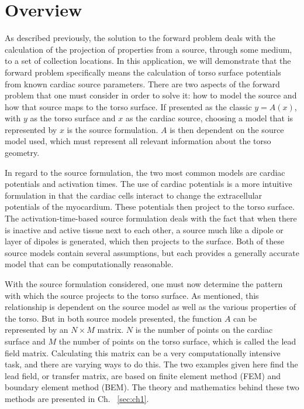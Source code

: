 \documentclass[fleqn,11pt,openany]{book}
\begin{document}
\section{Overview}

As described previously, the solution to the forward problem deals with the calculation of the projection of properties from a source, through some medium, to a set of collection locations. In this application, we will demonstrate that the forward problem specifically means the calculation of torso surface potentials from known cardiac source parameters. There are two aspects of the forward problem that one must consider in order to solve it: how to model the source and how that source maps to the torso surface. If presented as the classic $y=A(x)$,  with $y$ as the torso surface and $x$ as the cardiac source, choosing a model that is represented by $x$ is the source formulation. $A$ is then dependent on the source model used, which must represent all relevant information about the torso geometry.

In regard to the source formulation, the two most common models are cardiac potentials and activation times. The use of cardiac potentials is a more intuitive formulation in that the cardiac cells interact to change the extracellular potentials of the myocardium. These potentials then project to the torso surface. The activation-time-based source formulation deals with the fact that when there is inactive and active tissue next to each other, a source much like a dipole or layer of dipoles is generated, which then projects to the surface. Both of these source models contain several assumptions, but each provides a generally accurate model that can be computationally reasonable.

With the source formulation considered, one must now determine the pattern with which the source projects to the torso surface. As mentioned, this relationship is dependent on the source model as well as the various properties of the torso. But in both source models presented, the function $A$ can be represented by an $N \times M$ matrix. $N$ is the number of points on the cardiac surface and $M$ the number of points on the torso surface, which is called the lead field matrix. Calculating this matrix can be a very computationally intensive task, and there are varying ways to do this. The two examples given here find the lead field, or transfer matrix, are based on finite element method (FEM) and boundary element method (BEM). The theory and mathematics behind these two methods are presented in Ch. ~\ref{sec:ch1}.
\end{document}
